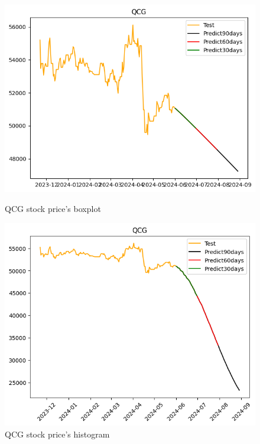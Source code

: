 \documentclass{ieeeojies}
\begin{document}
\begin{figure}[H]
  \centering
  \begin{minipage}{0.23\textwidth}
  \centering
  \includegraphics[width=1\textwidth]{bibliography/Figure/QCGGRU_9-1.png}
  \caption{QCG stock price's boxplot}
  \label{fig:1}
  \end{minipage}
  \hfill
  \begin{minipage}{0.23\textwidth}
  \centering
  \includegraphics[width=1\textwidth]{bibliography/Figure/QCGRNN_9-1.png}
  \caption{QCG stock price's histogram}
  \label{fig:2}
  \end{minipage}
\end{figure}
\end{document}
